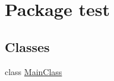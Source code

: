 \hypertarget{namespacetest}{\section{Package test}
\label{namespacetest}
}
\subsection*{Classes}
\begin{DoxyCompactItemize}
\item 
class \hyperlink{classtest_1_1MainClass}{Main\-Class}
\end{DoxyCompactItemize}

